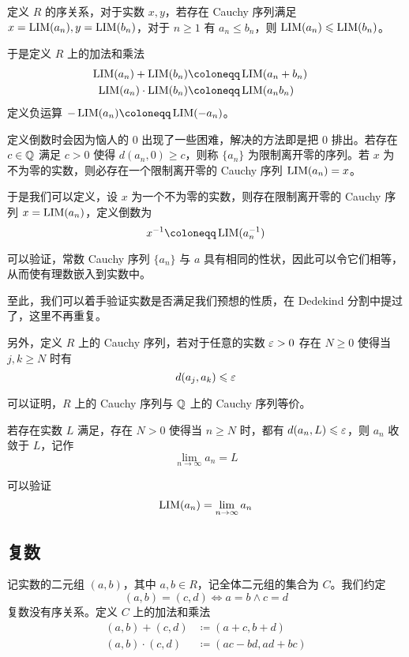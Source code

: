 定义 $R$ 的序关系，对于实数 $x,y$，若存在 Cauchy 序列满足 $x=\operatorname{{LIM}}(a_n),y=\operatorname{{LIM}}(b_n)$，对于 $n\geqslant 1$ 有 $a_n \leqslant b_n$，则 $\operatorname{{LIM}}(a_n) \leqslant \operatorname{{LIM}}(b_n)$。

于是定义 $R$ 上的加法和乘法
\begin{equation*}
	\begin{aligned}
		\LIM(a_n) + \LIM(b_n)     & \coloneqq  \LIM(a_n+b_n) & \\
		\LIM(a_n) \cdot \LIM(b_n) & \coloneqq  \LIM(a_nb_n)    \\
	\end{aligned}
\end{equation*}
定义负运算 $-\LIM(a_n) \coloneqq  \LIM(-a_n)$。

定义倒数时会因为恼人的 $0$ 出现了一些困难，解决的方法即是把 $0$ 排出。若存在 $c\in \mathbb{Q}$ 满足 $c > 0$ 使得 $d(a_n,0) \geqslant c$，则称 $\{a_n\}$ 为限制离开零的序列。若 $x$ 为不为零的实数，则必存在一个限制离开零的 Cauchy 序列 $\operatorname{{LIM}}(a_n) = x$。

于是我们可以定义，设 $x$ 为一个不为零的实数，则存在限制离开零的 Cauchy 序列 $x=\operatorname{{LIM}}(a_n)$，定义倒数为
$$x^{-1} \coloneqq  \LIM(a_n^{-1})$$

可以验证，常数 Cauchy 序列 $\{a_n\}$ 与 $a$ 具有相同的性状，因此可以令它们相等，从而使有理数嵌入到实数中。

至此，我们可以着手验证实数是否满足我们预想的性质，在 Dedekind 分割中提过了，这里不再重复。

另外，定义 $R$ 上的 Cauchy 序列，若对于任意的实数 $\varepsilon > 0$ 存在 $N \geqslant 0$ 使得当 $j,k \geqslant N$ 时有
$$d(a_j,a_k) \leqslant \varepsilon$$

可以证明，$R$ 上的 Cauchy 序列与 $\mathbb{Q}$ 上的 Cauchy 序列等价。

若存在实数 $L$ 满足，存在 $N>0$ 使得当 $n \geqslant N$ 时，都有 $d(a_n,L) \leqslant \varepsilon$，则 $a_n$ 收敛于 $L$，记作
$$\lim_{n\to \infty} a_n = L$$

可以验证
$$\operatorname{{LIM}}(a_n) = \lim_{n\to \infty} a_n$$

\subsection{复数}

记实数的二元组 $(a,b)$，其中 $a,b\in R$，记全体二元组的集合为 $C$。我们约定
\[(a,b) = (c,d) \Leftrightarrow a=b \land  c=d\]
复数没有序关系。定义 $C$ 上的加法和乘法
\[\begin{aligned}
		(a,b) + (c,d)     & \coloneqq  (a+c,b+d)     \\
		(a,b) \cdot (c,d) & \coloneqq  (ac-bd,ad+bc)
	\end{aligned}\]

